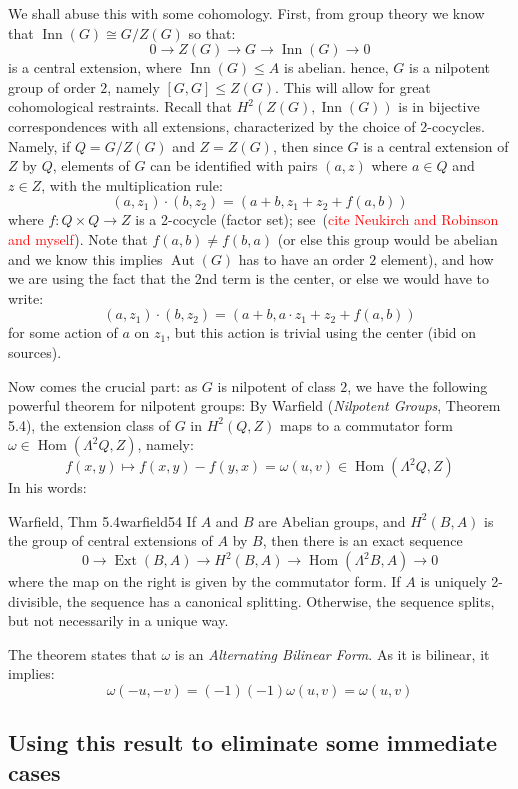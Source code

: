 \documentclass{book}
\newcommand{\Aut}{{\operatorname{Aut}}}
\newcommand{\Hom}{{\operatorname{Hom}}}
\newcommand{\Inn}{{\operatorname{Inn}}}
\newcommand{\subg}{\leqslant}
\begin{document}
We shall abuse this with some cohomology. First, from group theory we know that $\Inn(G) \cong G/Z(G)$ so
that:
\[
  0 \to Z(G) \to G \to \Inn(G) \to 0
\]
is a central extension, where $\Inn(G) \subg A$ is abelian. hence, $G$ is a nilpotent group of order $2$,
namely $[G,G] \subg Z(G)$. This will allow for great cohomological restraints. Recall that $H^2(Z(G),
\Inn(G))$ is in bijective correspondences with all extensions, characterized by the choice of 2-cocycles.
Namely, if $Q = G/Z(G)$ and $Z = Z(G)$, then since $G$ is a central extension of $Z$ by $Q$, elements of $G$ can be identified with pairs $(a, z)$ where $a \in Q$ and $z \in Z$, with the multiplication rule:
\[
(a, z_1) \cdot (b, z_2) = (a+b, z_1 + z_2 + f(a, b))
\]
where $f: Q \times Q \to Z$ is a 2-cocycle (factor set); see~(\textcolor{red}{cite Neukirch and Robinson and
myself}). Note that $f(a,b) \ne f(b,a)$ (or else this group would be abelian and we know this implies
$\Aut(G)$ has to have an order $2$ element), and how we are using the fact that the 2nd term is
the center, or else we would have to write:
\[
(a, z_1) \cdot (b, z_2) = (a+b, a\cdot z_1 + z_2 + f(a, b))
\]
for some action of $a$ on $z_1$, but this action is trivial using the center (ibid on sources).

Now comes the crucial part: as $G$ is nilpotent of class $2$, we have the following powerful theorem for
nilpotent groups: By Warfield (\textit{Nilpotent Groups}, Theorem 5.4), the extension class of $G$ in $H^2(Q,
Z)$ maps to a commutator form $\omega \in \operatorname{Hom}(\Lambda^2 Q, Z)$, namely:
\[
f(x,y) \mapsto  f(x,y) - f(y,x) = \omega(u, v) \in \Hom(\Lambda^2 Q, Z)
\]
In his words:
\begin{thm}{Warfield, Thm 5.4}{warfield54}
  If $A$ and $B$ are Abelian groups, and $H^2(B, A)$ is the group of central extensions of $A$ by $B$, then there is an exact sequence
  \[
  0 \to \operatorname{Ext}(B, A) \to H^2(B, A) \to \operatorname{Hom}(\Lambda^2 B, A) \to 0
  \]
  where the map on the right is given by the commutator form. If $A$ is uniquely 2-divisible, the sequence has
  a canonical splitting. Otherwise, the sequence splits, but not necessarily in a unique way.
\end{thm}
The theorem states that $\omega$ is an \emph{Alternating Bilinear Form}. As it is bilinear, it implies:
\[
  \omega(-u, -v) = (-1)(-1)\omega(u, v) = \omega(u, v)
\]

\subsection{Using this result to eliminate some immediate cases}
\end{document}

